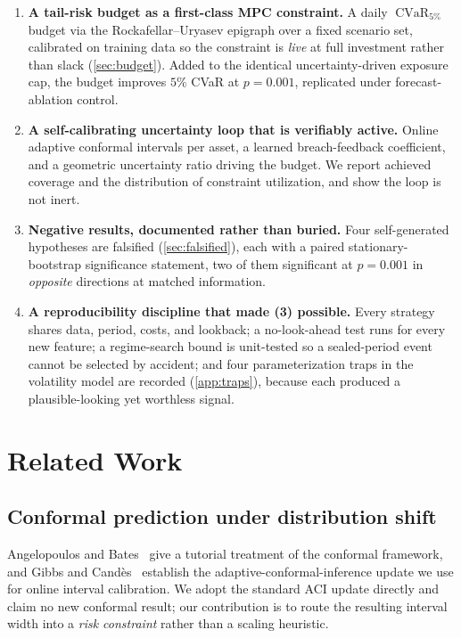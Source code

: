 \documentclass[journal]{IEEEtran}
\DeclareMathOperator{\CVaR}{\mathrm{CVaR}}
\begin{document}
\begin{enumerate}
\item \textbf{A tail-risk budget as a first-class MPC constraint.} A daily
$\CVaR_{5\%}$ budget via the Rockafellar--Uryasev epigraph over a fixed scenario
set, calibrated on training data so the constraint is \emph{live} at full
investment rather than slack (\cref{sec:budget}). Added to the identical
uncertainty-driven exposure cap, the budget improves $5\%$ CVaR at $p=0.001$,
replicated under forecast-ablation control.
\item \textbf{A self-calibrating uncertainty loop that is verifiably active.} Online
adaptive conformal intervals per asset, a learned breach-feedback coefficient, and
a geometric uncertainty ratio driving the budget. We report achieved coverage and
the distribution of constraint utilization, and show the loop is not inert.
\item \textbf{Negative results, documented rather than buried.} Four
self-generated hypotheses are falsified (\cref{sec:falsified}), each with a paired
stationary-bootstrap significance statement, two of them significant at $p=0.001$
in \emph{opposite} directions at matched information.
\item \textbf{A reproducibility discipline that made (3) possible.} Every strategy
shares data, period, costs, and lookback; a no-look-ahead test runs for every new
feature; a regime-search bound is unit-tested so a sealed-period event cannot be
selected by accident; and four parameterization traps in the volatility model are
recorded (\cref{app:traps}), because each produced a plausible-looking yet
worthless signal.
\end{enumerate}


\section{Related Work}
\label{sec:related}

\subsection{Conformal prediction under distribution shift}
Angelopoulos and Bates~\cite{angelopoulos2023gentle} give a tutorial treatment of
the conformal framework, and Gibbs and Cand\`es~\cite{gibbs2021adaptive} establish
the adaptive-conformal-inference update we use for online interval calibration.
We adopt the standard ACI update directly and claim no new conformal result; our
contribution is to route the resulting interval width into a \emph{risk
constraint} rather than a scaling heuristic.
\end{document}
